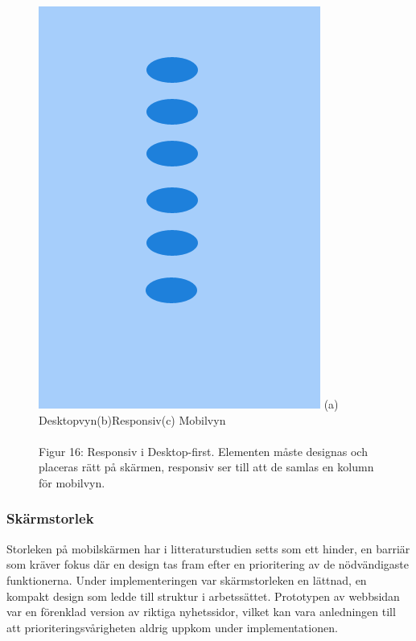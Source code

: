 \documentclass[11pt]{article}
\begin{document}
\begin{figure}[H]
{\includegraphics[scale=0.27]{pics/mobiledots.png}%
}
\hspace{1.7cm}(a) Desktopvyn\hspace{2.3cm}(b)Responsiv\hspace{2.1cm}(c) Mobilvyn
\\\\
\hspace{0.15cm}Figur 16: Responsiv i Desktop-first. Elementen måste designas och placeras rätt på skärmen, responsiv ser till att de samlas en kolumn för mobilvyn.
\end{figure}


\subsubsection{Skärmstorlek}
Storleken på mobilskärmen har i litteraturstudien setts som ett hinder, en barriär som kräver fokus där en design tas fram efter en prioritering av de nödvändigaste funktionerna. Under implementeringen var skärmstorleken en lättnad, en kompakt design som ledde till struktur i arbetssättet. Prototypen av webbsidan var en förenklad version av riktiga nyhetssidor, vilket kan vara anledningen till att prioriteringsvårigheten aldrig uppkom under implementationen.
\end{document}
